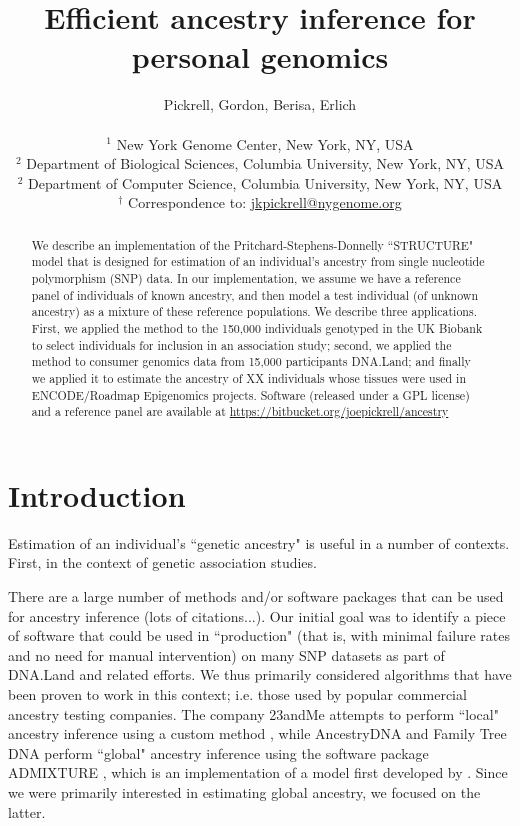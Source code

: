 \documentclass[11pt,titlepage]{article}
\begin{document}
\title{Efficient ancestry inference for personal genomics}
\author{Pickrell, Gordon, Berisa, Erlich\\ \\
\small $^1$ New York Genome Center, New York, NY, USA\\
\small $^2$ Department of Biological Sciences, Columbia University, New York, NY, USA \\
\small $^2$ Department of Computer Science, Columbia University, New York, NY, USA \\
\small $^\dagger$ Correspondence to: \url{jkpickrell@nygenome.org}
}
\maketitle
\begin{abstract}
We describe an implementation of the Pritchard-Stephens-Donnelly ``STRUCTURE" model that is designed for estimation of an individual's ancestry from single nucleotide polymorphism (SNP) data. In our implementation, we assume we have a reference panel of individuals of known ancestry, and then model a test individual (of unknown ancestry) as a mixture of these reference populations. We describe three applications. First, we applied the method to the 150,000 individuals genotyped in the UK Biobank to select individuals for inclusion in an association study; second, we applied the method to consumer genomics data from 15,000 participants DNA.Land; and finally we applied it to estimate the ancestry of XX individuals whose tissues were used in ENCODE/Roadmap Epigenomics projects. Software (released under a GPL license) and a reference panel are available at \url{https://bitbucket.org/joepickrell/ancestry}
\end{abstract}
\clearpage
\section{Introduction}
Estimation of an individual's ``genetic ancestry" is useful in a number of contexts. First, in the context of genetic association studies. 

There are a large number of methods and/or software packages that can be used for ancestry inference (lots of citations...). Our initial goal was to identify a piece of software that could be used in ``production" (that is, with minimal failure rates and no need for manual intervention) on many SNP datasets as part of DNA.Land and related efforts. We thus primarily considered algorithms that have been proven to work in this context; i.e. those used by popular commercial ancestry testing companies. The company 23andMe attempts to perform ``local" ancestry inference using a custom method \cite{durand2014ancestry}, while AncestryDNA and Family Tree DNA perform ``global" ancestry inference using the software package ADMIXTURE \citep{Alexander:2009fk}, which is an implementation of a model first developed by \citet{Pritchard:2000zr}. Since we were primarily interested in estimating global ancestry, we focused on the latter. 
\end{document}
